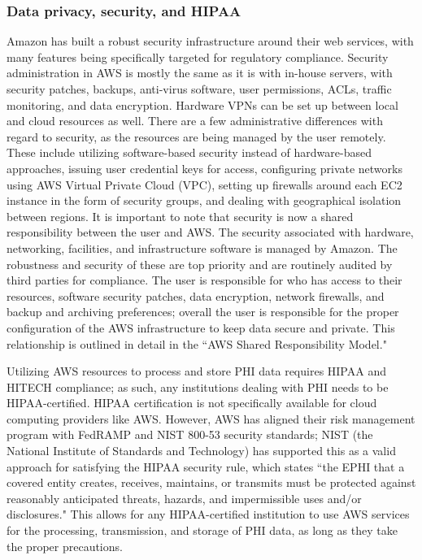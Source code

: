 \documentclass{frontiersSCNS} %
\begin{document}
\subsubsection{Data privacy, security, and HIPAA}
Amazon has built a robust security infrastructure around their web services, with many features being specifically targeted for regulatory compliance. Security administration in AWS is mostly the same as it is with in-house servers, with security patches, backups, anti-virus software, user permissions, ACLs, traffic monitoring, and data encryption. Hardware VPNs can be set up between local and cloud resources as well.
There are a few administrative differences with regard to security, as the resources are being managed by the user remotely. These include utilizing software-based security instead of hardware-based approaches, issuing user credential keys for access, configuring private networks using AWS Virtual Private Cloud (VPC), setting up firewalls around each EC2 instance in the form of security groups, and dealing with geographical isolation between regions. It is important to note that security is now a shared responsibility between the user and AWS. The security associated with hardware, networking, facilities, and infrastructure software is managed by Amazon. The robustness and security of these are top priority and are routinely audited by third parties for compliance. The user is responsible for who has access to their resources, software security patches, data encryption, network firewalls, and backup and archiving preferences; overall the user is responsible for the proper configuration of the AWS infrastructure to keep data secure and private. This relationship is outlined in detail in the ``AWS Shared Responsibility Model."


Utilizing AWS resources to process and store PHI data requires HIPAA and HITECH compliance; as such, any institutions dealing with PHI needs to be HIPAA-certified. HIPAA certification is not specifically available for cloud computing providers like AWS. However, AWS has aligned their risk management program with FedRAMP and NIST 800-53 security standards; NIST (the National Institute of Standards and Technology) has supported this as a valid approach for satisfying the HIPAA security rule, which states ``the EPHI that a covered entity creates, receives, maintains, or transmits must be protected against reasonably anticipated threats, hazards, and impermissible uses and/or disclosures." This allows for any HIPAA-certified institution to use AWS services for the processing, transmission, and storage of PHI data, as long as they take the proper precautions.
\end{document}
